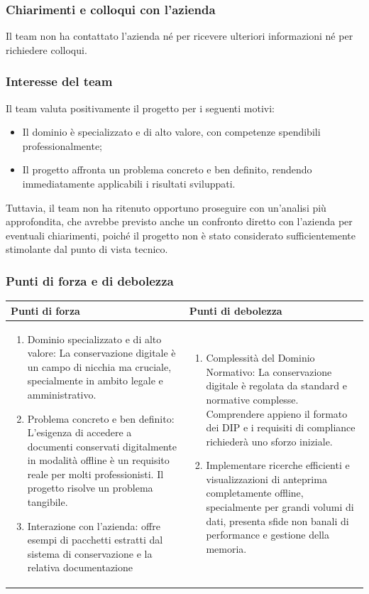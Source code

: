 \documentclass[a4paper,11pt]{article}
\begin{document}
\subsubsection{Chiarimenti e colloqui con l'azienda}
Il team non ha contattato l'azienda né per ricevere ulteriori informazioni né per richiedere colloqui.

\subsubsection{Interesse del team}
Il team valuta positivamente il progetto per i seguenti motivi:
\begin{itemize}[leftmargin=*]
  \item Il dominio è specializzato e di alto valore, con competenze spendibili professionalmente;
  \item Il progetto affronta un problema concreto e ben definito, rendendo immediatamente applicabili i risultati sviluppati.
\end{itemize}
Tuttavia, il team non ha ritenuto opportuno proseguire con un'analisi più approfondita, che avrebbe previsto anche 
un confronto diretto con l'azienda per eventuali chiarimenti, poiché il progetto non è stato considerato sufficientemente
 stimolante dal punto di vista tecnico.

\subsubsection{Punti di forza e di debolezza}
{\footnotesize
\begin{tabularx}{\textwidth}{|X|X|}
\hline
\rowcolor{lightgray!40} %
\textbf{Punti di forza} & \textbf{Punti di debolezza} \\
\hline
\begin{enumerate}
\item Dominio specializzato e di alto valore: La conservazione digitale è un campo di nicchia ma cruciale, specialmente in ambito legale e amministrativo.
\item Problema concreto e ben definito: L'esigenza di accedere a documenti conservati digitalmente in modalità offline è un requisito reale per molti professionisti. Il progetto risolve un problema tangibile.
\item Interazione con l'azienda: offre esempi di pacchetti estratti dal sistema di conservazione e la relativa documentazione
\end{enumerate}
 & \begin{enumerate}
\item Complessità del Dominio Normativo: La conservazione digitale è regolata da standard e normative complesse. Comprendere appieno il formato dei DIP e i requisiti di compliance richiederà uno sforzo iniziale.
\item Implementare ricerche efficienti e visualizzazioni di anteprima completamente offline, specialmente per grandi volumi di dati, presenta sfide non banali di performance e gestione della memoria.
\end{enumerate} \\
\hline
\end{tabularx}
}
\end{document}
